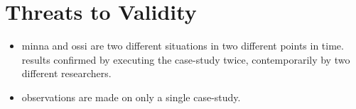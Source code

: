 \documentclass[conference]{IEEEtran}
\begin{document}
%
%


%



\section{Threats to Validity}
\begin{itemize}
\item minna and ossi are two different situations in two different points in time. results confirmed by executing the case-study twice, contemporarily by two different researchers.
\item observations are made on only a single case-study.
\end{itemize}
\end{document}
